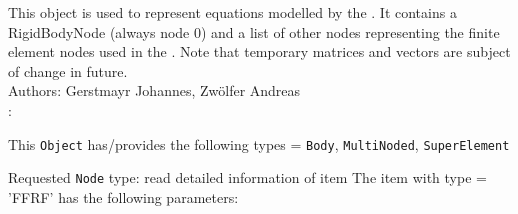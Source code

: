 \ei

%
\newpage


\label{sec:item:ObjectFFRF}
This object is used to represent equations modelled by the . It contains a RigidBodyNode (always node 0) and a list of other nodes representing the finite element nodes used in the . Note that temporary matrices and vectors are subject of change in future.
\vspace{12pt}\\

\noindent Authors: Gerstmayr Johannes, Zw\"olfer Andreas
\vspace{12pt}\\

\noindent {}:
\bi
  \item This \texttt{Object} has/provides the following types = \texttt{Body}, \texttt{MultiNoded}, \texttt{SuperElement}
  \item Requested \texttt{Node} type: read detailed information of item
\ei\vspace{12pt} \noindent 
The item  with type = 'FFRF' has the following parameters:
\vspace{-0.5cm}\\
\vspace{-0.5cm}\\

